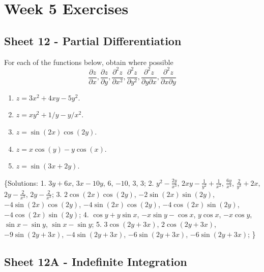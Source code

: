 \documentclass[
  11pt,
  oneside]{book}
\providecommand{\tightlist}{%
  \setlength{\itemsep}{0pt}\setlength{\parskip}{0pt}}
\newcommand{\slide}{}
\theoremstyle{definition}
\theoremstyle{definition}
\theoremstyle{definition}
\theoremstyle{definition}
\theoremstyle{remark}
\begin{document}
\chapter*{Week 5 Exercises}\label{week-5-exercises}

\section{Sheet 12 - Partial Differentiation}\label{sheet-12---partial-differentiation}

For each of the functions below, obtain where possible
\[
\frac{\partial z}{\partial x}, \frac{\partial z}{\partial y}, \frac{\partial^2 z}{\partial x^2}, \frac{\partial^2 z}{\partial y^2}, \frac{\partial^2 z}{\partial y\partial x}, \frac{\partial^2 z}{\partial x\partial y}
\]

\begin{enumerate}
\def\labelenumi{\arabic{enumi}.}
\tightlist
\item
  \(z=3x^2+4xy-5y^2\).
\item
  \(z=xy^2+1/y-y/x^2\).
\item
  \(z=\sin(2x)\cos(2y)\).
\item
  \(z=x\cos(y)-y\cos(x)\).
\item
  \(z=\sin(3x+2y)\).
\end{enumerate}

\{Solutions:
1. \(3 y + 6 x\), \(3 x - 10 y\), \(6\), \(-10\), \(3\), \(3\);
2. \(y^2-{\frac{2y}{x^3}}\), \(2xy-{\frac{1}{y^2}}+{\frac{1}{x^2}}\), \({\frac{6y}{x^4}}\), \({\frac{2}{y^3}}+2x\), \(2y-{\frac{2}{x^3}}\), \(2y-{\frac{2}{x^3}}\);
3. \(2\cos \left(2x\right)\cos \left(2y\right)\), \(-2\sin \left(2x\right)\sin \left(2y\right)\), \(-4\sin \left(2x\right)\cos \left(2y\right)\), \(-4\sin \left(2x\right)\cos \left(2y\right)\), \(-4\cos \left(2x\right)\sin \left(2y\right)\), \(-4\cos \left(2x\right)\sin \left(2y\right)\);
4. \(\cos y+y\sin x\), \(-x\sin y-\cos x\), \(y\cos x\), \(-x\cos y\), \(\sin x-\sin y\), \(\sin x-\sin y\);
5. \(3\cos \left(2y+3x\right)\), \(2\cos \left(2y+3x\right)\), \(-9\sin \left(2y+3x\right)\), \(-4\sin \left(2y+3x\right)\), \(-6\sin \left(2y+3x\right)\), \(-6\sin \left(2y+3x\right)\);
\}

\slide

\section{Sheet 12A - Indefinite Integration}\label{sheet-12a---indefinite-integration}
\end{document}
